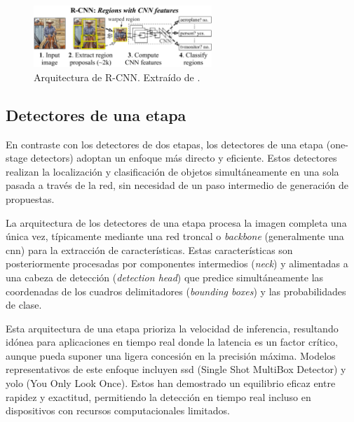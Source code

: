 \documentclass[11pt,spanish,listoffigures,listoftables]{tfgetsinf}
\begin{document}
\begin{figure}[H]
   \centering
   \includegraphics[width=0.6\textwidth]{images/estado_del_arte/R-CNN.png}
   \caption[Arquitectura de R-CNN]{Arquitectura de R-CNN. Extraído de \cite[fig. 1, p. ~1]{girshick2014richfeaturehierarchiesaccurate}.}
   \label{fig:r-cnn}
\end{figure}

\subsection{Detectores de una etapa}\label{sec:one_stage_detectors}

En contraste con los detectores de dos etapas, los detectores de una etapa (one-stage detectors) adoptan un enfoque más directo y eficiente. Estos detectores realizan la localización y clasificación de objetos simultáneamente en una sola pasada a través de la red, sin necesidad de un paso intermedio de generación de propuestas.

La arquitectura de los detectores de una etapa procesa la imagen completa una única vez, típicamente mediante una red troncal o \textit{backbone} (generalmente una \gls{cnn}) para la extracción de características. Estas características son posteriormente procesadas por componentes intermedios (\textit{neck}) y alimentadas a una cabeza de detección (\textit{detection head}) que predice simultáneamente las coordenadas de los cuadros delimitadores (\textit{bounding boxes}) y las probabilidades de clase.

Esta arquitectura de una etapa prioriza la velocidad de inferencia, resultando idónea para aplicaciones en tiempo real donde la latencia es un factor crítico, aunque pueda suponer una ligera concesión en la precisión máxima. Modelos representativos de este enfoque incluyen \gls{ssd} (Single Shot MultiBox Detector)\cite{Liu_2016} y \gls{yolo} (You Only Look Once)\cite{redmon2016lookonceunifiedrealtime}. Estos han demostrado un equilibrio eficaz entre rapidez y exactitud, permitiendo la detección en tiempo real incluso en dispositivos con recursos computacionales limitados.
\end{document}
